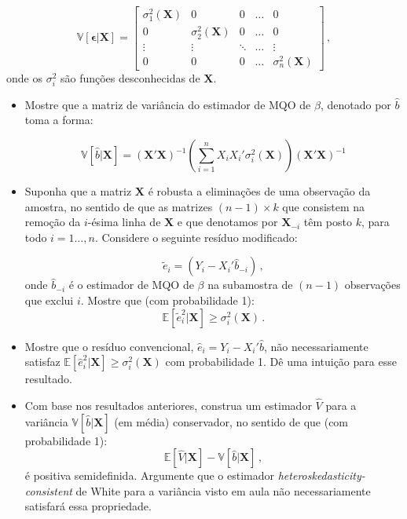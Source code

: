 \documentclass[10pt,a4paper]{article}
\begin{document}
 $$\mathbb{V}[\boldsymbol{\epsilon}|\boldsymbol{X}] = \begin{bmatrix}
 	\sigma^2_1(\boldsymbol{X}) & 0 & 0 & \ldots & 0 \\
 	0 & 	\sigma^2_2(\boldsymbol{X}) & 0 & \ldots & 0 \\
 	\vdots & \vdots &\ddots & \ldots & \vdots  \\
 	0 & 0 & 0 & \ldots & \sigma^2_n(\boldsymbol{X})
 \end{bmatrix}\, ,$$
 onde os $\sigma^2_i$ são funções desconhecidas de $\boldsymbol{X}$. 
 \begin{itemize}
 	\item[a] Mostre que  a matriz de variância do estimador de MQO de $\beta$, denotado por $\hat{b}$ toma a forma:
 	
 	$$\mathbb{V}[\hat{b}|\boldsymbol{X}] = (\boldsymbol{X}'\boldsymbol{X})^{-1}\left(\sum_{i=1}^n X_i X_i' \sigma_i^2(\boldsymbol{X})\right)(\boldsymbol{X}'\boldsymbol{X})^{-1}$$
 	
 	\item[b] Suponha que a matriz $\boldsymbol{X}$ é robusta a eliminações de uma observação da amostra, no sentido de que as matrizes $(n-1)\times k$ que consistem na remoção da $i$-ésima linha de $\boldsymbol{X}$ e que denotamos por $\boldsymbol{X}_{-i}$ têm posto $k$, para todo $i=1\ldots, n$. Considere o seguinte resíduo modificado:
 	
 	$$\tilde{e}_i = (Y_i - X_i'\hat{b}_{-i})\,,$$
 	onde $\hat{b}_{-i}$ é o estimador de MQO de $\beta$ na subamostra de $(n-1)$ observações que exclui $i$. Mostre que (com probabilidade 1):
 	$$\mathbb{E}[\tilde{e}_i^2|\boldsymbol{X}]\geq \sigma^2_i(\boldsymbol{X})\, .$$
 	
 	\item[c]  Mostre que o resíduo convencional, $\hat{e}_i = Y_i-X_i'\hat{b}$, não necessariamente satisfaz $\mathbb{E}[\hat{e}_i^2|\boldsymbol{X}]\geq \sigma^2_i(\boldsymbol{X})$ com probabilidade 1. Dê uma intuição para esse resultado.
 	\item[d]  Com base nos resultados anteriores, construa um estimador $\hat{V}$ para a variância $\mathbb{V}[\hat{b}|\boldsymbol{X}]$ (em média) conservador, no sentido de que (com probabilidade 1):
 	$$\mathbb{E}[\hat{V}|\boldsymbol{X}] - \mathbb{V}[\hat{b}|\boldsymbol{X}]\, ,$$
 	é positiva semidefinida. Argumente que o estimador \textit{heteroskedasticity-consistent} de White para a variância visto em aula não necessariamente satisfará essa propriedade.
 \end{itemize} 
 
\end{document}
